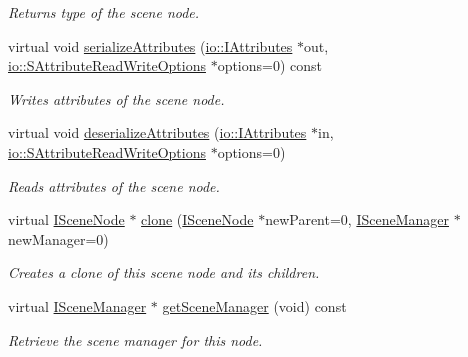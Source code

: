 \begin{DoxyCompactItemize}
\begin{DoxyCompactList}\small\item\em Returns type of the scene node. \end{DoxyCompactList}\item 
virtual void \hyperlink{classirr_1_1scene_1_1ISceneNode_a3210345b70227c03c7f889c94754fdaa}{serialize\+Attributes} (\hyperlink{classirr_1_1io_1_1IAttributes}{io\+::\+I\+Attributes} $\ast$out, \hyperlink{structirr_1_1io_1_1SAttributeReadWriteOptions}{io\+::\+S\+Attribute\+Read\+Write\+Options} $\ast$options=0) const
\begin{DoxyCompactList}\small\item\em Writes attributes of the scene node. \end{DoxyCompactList}\item 
virtual void \hyperlink{classirr_1_1scene_1_1ISceneNode_a5fb609b08fc89a92f928c19ce3b181eb}{deserialize\+Attributes} (\hyperlink{classirr_1_1io_1_1IAttributes}{io\+::\+I\+Attributes} $\ast$in, \hyperlink{structirr_1_1io_1_1SAttributeReadWriteOptions}{io\+::\+S\+Attribute\+Read\+Write\+Options} $\ast$options=0)
\begin{DoxyCompactList}\small\item\em Reads attributes of the scene node. \end{DoxyCompactList}\item 
virtual \hyperlink{classirr_1_1scene_1_1ISceneNode}{I\+Scene\+Node} $\ast$ \hyperlink{classirr_1_1scene_1_1ISceneNode_ac39832b55855dc59196053adbaec95cc}{clone} (\hyperlink{classirr_1_1scene_1_1ISceneNode}{I\+Scene\+Node} $\ast$new\+Parent=0, \hyperlink{classirr_1_1scene_1_1ISceneManager}{I\+Scene\+Manager} $\ast$new\+Manager=0)
\begin{DoxyCompactList}\small\item\em Creates a clone of this scene node and its children. \end{DoxyCompactList}\item 
virtual \hyperlink{classirr_1_1scene_1_1ISceneManager}{I\+Scene\+Manager} $\ast$ \hyperlink{classirr_1_1scene_1_1ISceneNode_a394f112e9b4a1c66f7d58e873a3f8a1d}{get\+Scene\+Manager} (void) const
\begin{DoxyCompactList}\small\item\em Retrieve the scene manager for this node. \end{DoxyCompactList}\end{DoxyCompactItemize}
